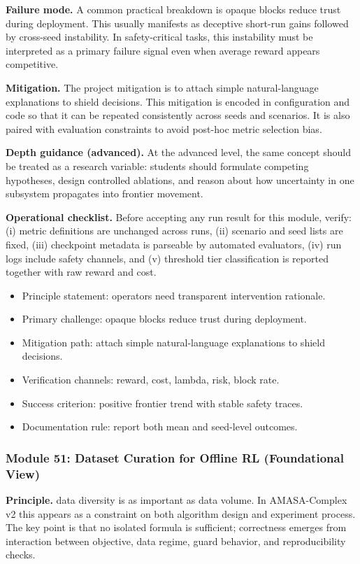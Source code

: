 \documentclass[conference]{IEEEtran}
\begin{document}
\textbf{Failure mode.} A common practical breakdown is opaque blocks reduce trust during deployment. This usually manifests as deceptive short-run gains followed by cross-seed instability. In safety-critical tasks, this instability must be interpreted as a primary failure signal even when average reward appears competitive.

\textbf{Mitigation.} The project mitigation is to attach simple natural-language explanations to shield decisions. This mitigation is encoded in configuration and code so that it can be repeated consistently across seeds and scenarios. It is also paired with evaluation constraints to avoid post-hoc metric selection bias.

\textbf{Depth guidance (advanced).} At the advanced level, the same concept should be treated as a research variable: students should formulate competing hypotheses, design controlled ablations, and reason about how uncertainty in one subsystem propagates into frontier movement.

\textbf{Operational checklist.} Before accepting any run result for this module, verify: (i) metric definitions are unchanged across runs, (ii) scenario and seed lists are fixed, (iii) checkpoint metadata is parseable by automated evaluators, (iv) run logs include safety channels, and (v) threshold tier classification is reported together with raw reward and cost.

\begin{itemize}[leftmargin=*]
  \item Principle statement: operators need transparent intervention rationale.
  \item Primary challenge: opaque blocks reduce trust during deployment.
  \item Mitigation path: attach simple natural-language explanations to shield decisions.
  \item Verification channels: reward, cost, lambda, risk, block rate.
  \item Success criterion: positive frontier trend with stable safety traces.
  \item Documentation rule: report both mean and seed-level outcomes.
\end{itemize}


\subsubsection{Module 51: Dataset Curation for Offline RL (Foundational View)}
\textbf{Principle.} data diversity is as important as data volume. In AMASA-Complex v2 this appears as a constraint on both algorithm design and experiment process. The key point is that no isolated formula is sufficient; correctness emerges from interaction between objective, data regime, guard behavior, and reproducibility checks.
\end{document}

